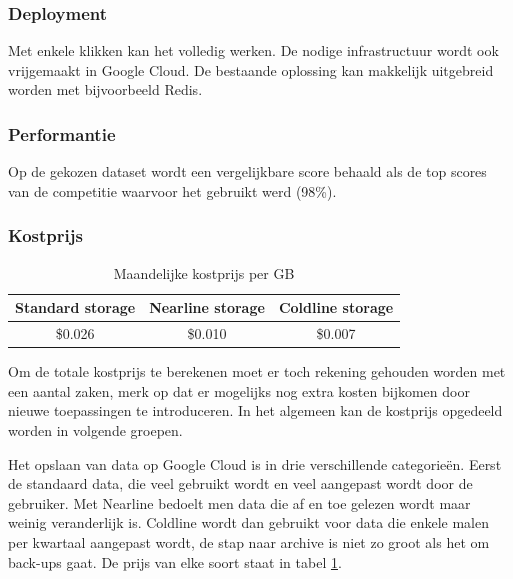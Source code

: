 \subsubsection{Deployment}
\label{sucsubsec:google-nfr-deployment}

Met enkele klikken kan het volledig werken. De nodige infrastructuur wordt ook vrijgemaakt in Google Cloud. De bestaande oplossing kan makkelijk uitgebreid worden met bijvoorbeeld Redis.

\subsubsection{Performantie}
\label{sucsubsec:google-nfr-performantie}

Op de gekozen dataset wordt een vergelijkbare score behaald als de top scores van de competitie waarvoor het gebruikt werd (98\%).

\subsubsection{Kostprijs}
\label{sucsubsec:google-nfr-price}

\begin{table}[b!]
    \centering
    \begin{tabular}{||c c c||} 
        \hline
        Standard storage & Nearline storage & Coldline storage \\ [0.5ex] 
        \hline\hline
        \$0.026 & \$0.010 & \$0.007  \\ 
        \hline
    \end{tabular}
    \caption{Maandelijke kostprijs per GB}
    \label{table:google-storage-price}
\end{table}

Om de totale kostprijs te berekenen moet er toch rekening gehouden worden met een aantal zaken, merk op dat er mogelijks nog extra kosten bijkomen door nieuwe toepassingen te introduceren. In het algemeen kan de kostprijs opgedeeld worden in volgende groepen.

Het opslaan van data op Google Cloud is in drie verschillende categorieën. Eerst de standaard data, die veel gebruikt wordt en veel aangepast wordt door de gebruiker. Met Nearline bedoelt men data die af en toe gelezen wordt maar weinig veranderlijk is. Coldline wordt dan gebruikt voor data die enkele malen per kwartaal aangepast wordt, de stap naar archive is niet zo groot als het om back-ups gaat. De prijs van elke soort staat in tabel \ref{table:google-storage-price}.

